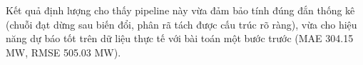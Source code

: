Kết quả định lượng cho thấy pipeline này vừa đảm bảo tính đúng đắn thống kê (chuỗi đạt dừng sau biến đổi, phân rã tách được cấu trúc rõ ràng), vừa cho hiệu năng dự báo tốt trên dữ liệu thực tế với bài toán một bước trước (MAE 304.15 MW, RMSE 505.03 MW).


